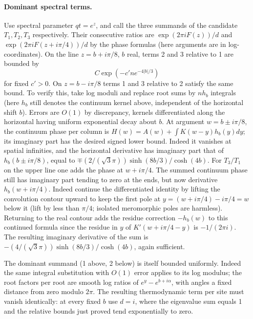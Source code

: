 \paragraph{Dominant spectral terms.}
Use spectral parameter \(qt=e^z\), and call the three summands of the candidate \(T_1,T_2,T_3\) respectively. Their consecutive ratios are \(\exp(2\pi i F(z))/d\) and \(\exp(2\pi i F(z+i\pi/4))/d\) by the phase formulas (here arguments are in log-coordinates). On the line \(z=b+i\pi/8\), \(b\) real, terms 2 and 3 relative to 1 are bounded by
\[
 C\exp(-c' n e^{-4|b|/3})
\]
for fixed \(c'>0\). On \(z=b-i\pi/8\) terms 1 and 3 relative to 2 satisfy the same bound. To verify this, take log moduli and replace root sums by \(n h_b\) integrals (here \(h_b\) still denotes the continuum kernel above, independent of the horizontal shift \(b\)). Errors are \(O(1)\) by discrepancy, kernels differentiated along the horizontal having uniform exponential decay about \(b\). At argument \(w=b\pm i\pi/8\), the continuum phase per column is \(H(w)=A(w)+\int K(w-y)h_b(y)dy\); its imaginary part has the desired signed lower bound. Indeed it vanishes at spatial infinities, and the horizontal derivative has imaginary part that of \(h_b(b\pm i\pi/8)\), equal to \(\mp(2/(\sqrt3\pi))\sinh(8b/3)/\cosh(4b)\). For \(T_3/T_1\) on the upper line one adds the phase at \(w+i\pi/4\). The summed continuum phase still has imaginary part tending to zero at the ends, but now derivative \(h_b(w+i\pi/4)\). Indeed continue the differentiated identity by lifting the convolution contour upward to keep the first pole at \(y=(w+i\pi/4)-i\pi/4=w\) below it (lift by less than \(\pi/4\); isolated meromorphic poles are harmless). Returning to the real contour adds the residue correction \(-h_b(w)\) to this continued formula since the residue in \(y\) of \(K'(w+i\pi/4-y)\) is \(-1/(2\pi i)\). The resulting imaginary derivative of the sum is \(-(4/(\sqrt3\pi))\sinh(8b/3)/\cosh(4b)\), again sufficient.

The dominant summand (1 above, 2 below) is itself bounded uniformly. Indeed the same integral substitution with \(O(1)\) error applies to its log modulus; the root factors per root are smooth log ratios of \(e^y-e^{b+i\alpha}\), with angles a fixed distance from zero modulo \(2\pi\). The resulting thermodynamic term per site must vanish identically: at every fixed \(b\) use \(d=i\), where the eigenvalue sum equals 1 and the relative bounds just proved tend exponentially to zero.

